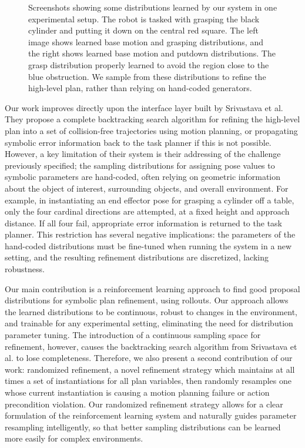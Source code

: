 \begin{figure}[h]
  \caption{Screenshots showing some distributions learned by our system in one experimental
    setup. The robot is tasked with grasping the black cylinder and putting it down on the
    central red square. The left image shows learned base motion and grasping distributions,
    and the right shows learned base motion and putdown distributions. The grasp distribution
    properly learned to avoid the region close to the blue obstruction. We sample from these distributions
    to refine the high-level plan, rather than relying on hand-coded generators.}
  \label{fig:cover}
\end{figure}

Our work improves directly upon the interface layer built
by Srivastava et al. They propose a complete backtracking search algorithm for refining
the high-level plan into a set of collision-free trajectories using motion planning, or
propagating symbolic error information back to the task planner if this is not possible.
However, a key limitation of their system is their addressing of the challenge
previously specified; the sampling distributions for
assigning pose values to symbolic parameters are hand-coded, often relying on
geometric information about the object of interest, surrounding objects, and overall
environment. For example, in instantiating an end effector pose for grasping a cylinder off a table,
only the four cardinal directions are attempted, at a fixed height and approach
distance. If all four fail, appropriate error information is returned to the task planner.
This restriction has several negative implications: the parameters of the
hand-coded distributions must be fine-tuned when running the system in a new setting, and the
resulting refinement distributions are discretized, lacking robustness.

Our main contribution is a reinforcement learning approach to find good proposal
distributions for symbolic plan refinement, using rollouts. Our approach allows
the learned distributions to be continuous, robust to changes in the environment, and
trainable for any experimental setting, eliminating the need for distribution parameter tuning. The
introduction of a continuous sampling space for refinement, however, causes the backtracking
search algorithm from Srivastava et al. to lose completeness. Therefore, we also
present a second contribution of our work: randomized refinement, a novel refinement strategy
which maintains at all times a set of instantiations for all plan variables, then randomly
resamples one whose current instantiation is causing a motion planning failure or action precondition
violation. Our randomized refinement strategy allows for a clear formulation of the reinforcement
learning system and naturally guides parameter resampling intelligently, so that better
sampling distributions can be learned more easily for complex environments.

